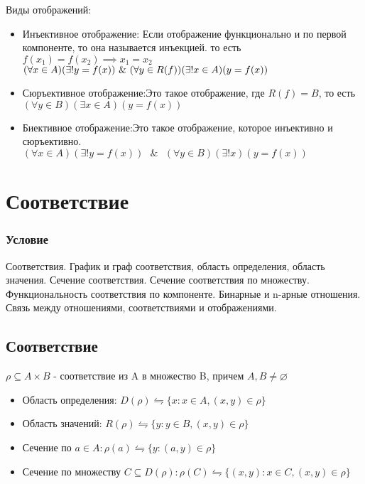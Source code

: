 \documentclass{report}
\newcommand{\band}{\mbox{ } \& \mbox{ }}
\begin{document}
Виды отображений:
\begin{itemize}
	\item Инъективное отображение:\newline
		Если отображение функционально и по первой компоненте,
		то она называется инъекцией. то есть $f(x_1) = f(x_2) \implies x_1 = x_2$\newline
	      $(\forall x \in A)(\exists!\space y = f(x)) \band (\forall y \in R(f))(\exists!\space x \in A)(y = f(x))$
	\item Сюръективное отображение:\newline Это такое отображение, где $R(f) = B$, то есть\newline
	      $(\forall y \in B)(\exists x \in A)(y = f(x))$
	\item Биективное отображение:\newline Это такое отображение, которое инъективно и сюръективно.\newline
	      $(\forall x \in A)(\exists! y = f(x)) \band (\forall y \in B)(\exists! x)(y = f(x))$
\end{itemize}
\newpage

\section{Соответствие}
\subsubsection{Условие}
Соответствия. График и граф соответствия, область определения, область значения.
Сечение соответствия. Сечение соответствия по множеству. Функциональность
соответствия по компоненте. Бинарные и n-арные отношения. Связь между
отношениями, соответствиями и отображениями.

\subsection{Соответствие}
$\rho \subseteq A \times B$ - соответствие из A в множество B, причем $A,B \neq \varnothing$


\begin{itemize}
	\item Область определения: $D(\rho) \leftrightharpoons \{x:x \in A, (x,y) \in \rho\}$
	\item Область значений: $R(\rho) \leftrightharpoons \{y:y \in B, (x,y) \in \rho\}$
	\item Сечение по $a \in A: \rho(a) \leftrightharpoons \{y: (a,y) \in \rho\}$
	\item Сечение по множеству $C \subseteq D(\rho): \rho(C) \leftrightharpoons \{(x,y):x \in C, (x,y) \in \rho\}$
\end{itemize}
\end{document}

